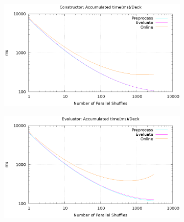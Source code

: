 \documentclass[twoside,11pt,openright]{report}
\begin{document}
\begin{figure}
    \centering

    \begin{subfigure}{\textwidth}
        \label{fig:const_ms_plot}
        \includegraphics[width=\textwidth]{figurs/const_ms_log_xy.eps}
        \caption{}
    \end{subfigure}

    \vspace*{1cm}

    \begin{subfigure}{\textwidth}
        \label{fig:eval_ms_plot}
        \includegraphics[width=\textwidth]{figurs/eval_ms_log_xy.eps}
        \caption{}
    \end{subfigure}

    \caption{}
    \label{fig:mesurement_ms}
\end{figure}
\end{document}
